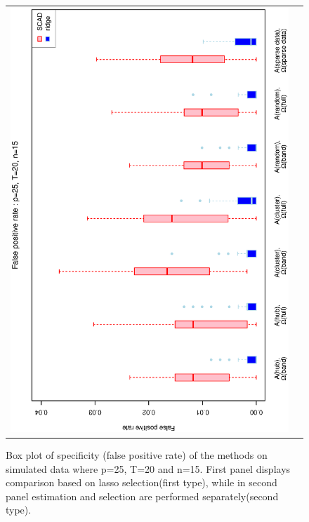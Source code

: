 \documentclass[a4paper]{article}
\begin{document}
\begin{figure}[h!]
\begin{tabular}{cc}
\includegraphics[scale=0.5,angle=270]{ROCfpr25T20N15b.eps}\\
\end{tabular}
\caption{Box plot of specificity (false positive rate) of the methods on simulated data where p=25, T=20 and n=15. First panel displays comparison based on lasso selection(first type), while in second panel estimation and selection are performed separately(second type).}
\label{fig:fpr25T20N15}
\end{figure}
\end{document}

